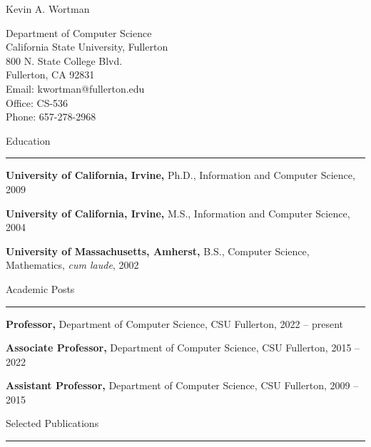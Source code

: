 \documentclass[11pt]{letter}
\begin{document}
\newcommand{\heading}[1]{ \vspace{11pt} {\Large #1} \\ \rule{6.5in}{.5pt} }

{\Large Kevin A. Wortman}
\begin{multicols}{2}
Department of Computer Science\\
California State University, Fullerton\\
800 N. State College Blvd.\\
Fullerton, CA 92831\\

Email: kwortman@fullerton.edu\\
Office: CS-536\\
Phone: 657-278-2968\\
\end{multicols}

\heading{Education}

\textbf{University of California, Irvine,} Ph.D., Information and Computer Science, 2009 

\textbf{University of California, Irvine,} M.S., Information and Computer Science, 2004 

\textbf{University of Massachusetts, Amherst,} B.S., Computer Science, Mathematics, \emph{cum laude}, 2002

\heading{Academic Posts}

\textbf{Professor,} Department of Computer Science, CSU Fullerton, 2022 -- present

\textbf{Associate Professor,} Department of Computer Science, CSU Fullerton, 2015 -- 2022

\textbf{Assistant Professor,} Department of Computer Science, CSU Fullerton, 2009 -- 2015

\heading{Selected Publications}
\end{document}
